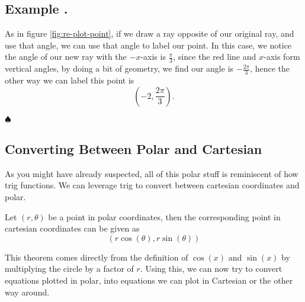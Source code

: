 \documentclass[11pt]{article}
\numberwithin{lemma}{section}
\numberwithin{equation}{section}
\numberwithin{define}{section}
\numberwithin{prop}{section}
\numberwithin{figure}{section}
\numberwithin{theorem}{section}
\numberwithin{cor}{section}
\newcounter{ex}[section]
\newenvironment{ex}[0]{

	\refstepcounter{ex}
    \subsection*{Example \theex .}
    }
    {
    \hfill$\spadesuit$
    \par
    }
\numberwithin{ex}{section}
\def\paren#1{\left(#1\right)}
\begin{document}
\begin{ex}
\begin{figure*}[h]
{}
	\caption{}
	\label{fig:re-plot-point}
	\end{figure*}
	As in figure \eqref{fig:re-plot-point}, if we draw a ray opposite of our original ray, and use that angle, we can use that angle to label our point. In this case, we notice the angle of our new ray with the $-x$-axis is $\frac{\pi}{3}$, since the red line and $x$-axis form vertical angles, by doing a bit of geometry, we find our angle is $-\frac{2\pi}{3}$, hence the other way we can label this point is
	$$(-2,\frac{2\pi}{3}).$$
\end{ex}

\subsection{Converting Between Polar and Cartesian}
As you might have already suspected, all of this polar stuff is reminiscent of how trig functions. We can leverage trig to convert between cartesian coordinates and polar.

\begin{theorem}
Let $(r,\theta)$ be a point in polar coordinates, then the corresponding point in cartesian coordinates can be given as
$$(r\cos(\theta),r\sin(\theta))$$
\label{thm:poletocart}
\end{theorem}
This theorem comes directly from the definition of $\cos(x)$ and $\sin(x)$ by multiplying the circle by a factor of $r$. Using this, we can now try to convert equations plotted in polar, into equations we can plot in Cartesian or the other way around.
\end{document}
